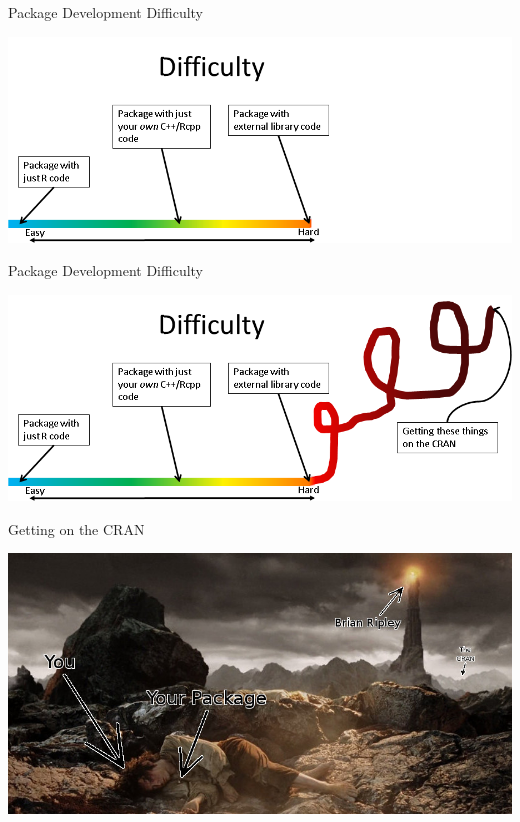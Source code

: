 \begin{frame}{Package Development Difficulty}
\begin{center}
\includegraphics[scale=.55]{pics/packages_hidden}
\end{center}
\end{frame}

\begin{frame}{Package Development Difficulty}
\begin{center}
\includegraphics[scale=.55]{pics/packages}
\end{center}
\end{frame}

\begin{frame}{Getting on the CRAN}
\begin{center}
\includegraphics[scale=.46]{pics/cran_ripley}
\end{center}
\end{frame}
